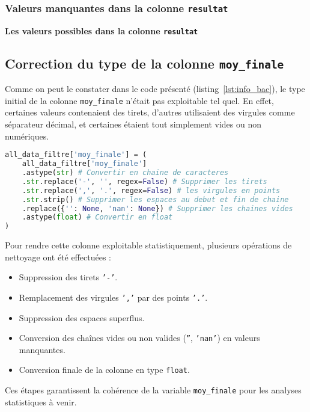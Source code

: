 \subsubsection{Valeurs manquantes dans la colonne \texttt{resultat}}

\textbf{Les valeurs possibles dans la colonne \texttt{resultat}}

\newpage
\subsection{Correction du type de la colonne \texttt{moy\_finale}}

Comme on peut le constater dans le code présenté (listing~\ref{lst:info_bac}), le type initial de la colonne \texttt{moy\_finale} n'était pas exploitable tel quel. 
En effet, certaines valeurs contenaient des tirets, d'autres utilisaient des virgules comme séparateur décimal, et certaines étaient tout simplement vides ou non numériques.

\begin{lstlisting}[language=Python,
    caption=Correction du type de la colonne moy\_finale,
    label=lst:moy_finale_type,
    basicstyle=\ttfamily\small,
    backgroundcolor=\color{gray!10}
]
all_data_filtre['moy_finale'] = (
    all_data_filtre['moy_finale']
    .astype(str) # Convertir en chaine de caracteres
    .str.replace('-', '', regex=False) # Supprimer les tirets
    .str.replace(',', '.', regex=False) # les virgules en points
    .str.strip() # Supprimer les espaces au debut et fin de chaine
    .replace({'': None, 'nan': None}) # Supprimer les chaines vides
    .astype(float) # Convertir en float
)
\end{lstlisting}

Pour rendre cette colonne exploitable statistiquement, plusieurs opérations de nettoyage ont été effectuées :
\begin{itemize}
\item Suppression des tirets \texttt{'-'}.
\item Remplacement des virgules \texttt{','} par des points \texttt{'.'}.
\item Suppression des espaces superflus.
\item Conversion des chaînes vides ou non valides (\texttt{''}, \texttt{'nan'}) en valeurs manquantes.
\item Conversion finale de la colonne en type \texttt{float}.
\end{itemize}

Ces étapes garantissent la cohérence de la variable \texttt{moy\_finale} pour les analyses statistiques à venir.

